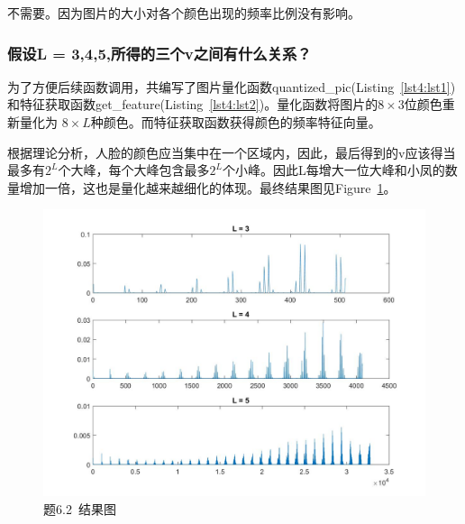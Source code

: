 \documentclass[a4paper]{article}
\begin{document}
		不需要。因为图片的大小对各个颜色出现的频率比例没有影响。
		
		\subsubsection{假设L = 3,4,5,所得的三个v之间有什么关系？}
		
		为了方便后续函数调用，共编写了图片量化函数quantized\_pic(Listing~\ref{lst4:lst1})和特征获取函数get\_feature(Listing~\ref{lst4:lst2})。量化函数将图片的$ 8 \times 3 $位颜色重新量化为 $ 8 \times L $种颜色。而特征获取函数获得颜色的频率特征向量。
		
		根据理论分析，人脸的颜色应当集中在一个区域内，因此，最后得到的v应该得当最多有$ 2^L$个大峰，每个大峰包含最多$ 2^L $个小峰。因此L每增大一位大峰和小凤的数量增加一倍，这也是量化越来越细化的体现。最终结果图见Figure~\ref{fig12}。
		
		\begin{figure}[h]
			\centering
			\includegraphics[width = .6\textwidth]{../source/3.4/L_from_three_to_five.jpg}
			\caption{题6.2~结果图}
			\label{fig12}
		\end{figure}
	
		
		
		
		
		
		
\end{document}
